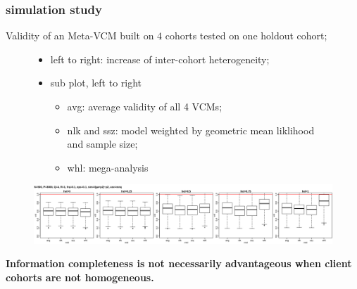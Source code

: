 \documentclass{beamer}
\begin{document}
\begin{frame}\frametitle{simulation study}
  Validity of an Meta-VCM built on $4$ cohorts tested on one holdout
  cohort;
  \begin{figure}
    \raggedright \scriptsize
    \begin{itemize}
    \item left to right: increase of inter-cohort heterogeneity;\\
    \item sub plot, left to right
      \begin{itemize} \scriptsize
      \item avg: average validity of all 4 VCMs;
      \item nlk and ssz: model weighted by geometric mean liklihood
        and sample size;
      \item whl: mega-analysis
      \end{itemize}
    \end{itemize}
    \centering \includegraphics[width=\linewidth]{km2_mnq_s01.png}
  \end{figure}
  \normalsize \textbf{Information completeness is not necessarily
    advantageous when client cohorts are not homogeneous.}
\end{frame}
\end{document}
